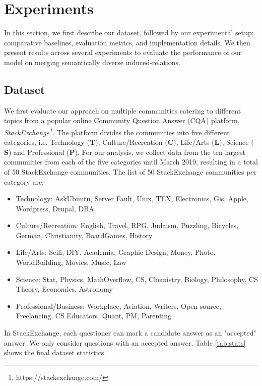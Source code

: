 \section{Experiments}
\label{sec:induced_experiments}
In this section, we first describe our dataset, followed by our experimental setup; comparative baselines, evaluation metrics, and implementation details. We then present results across several experiments to evaluate the performance of our model on merging semantically diverse induced-relations.

\subsection{Dataset}
We first evaluate our approach on multiple communities catering to different topics from a popular online Community Question Answer (CQA) platform, \emph{StackExchange\footnote{https://stackexchange.com/}}. The platform divides the communities into five different categories, i.e. Technology ($\mathbf{T}$), Culture/Recreation ($\mathbf{C}$), Life/Arts ($\mathbf{L}$), Science ($\mathbf{S}$) and Professional ($\mathbf{P}$).
For our analysis, we collect data from the ten largest communities from each of the five categories until March 2019, resulting in a total of 50 StackExchange communities.
The list of 50 StackExchange communities per category are;
\begin{itemize}
\item Technology: AskUbuntu, Server Fault, Unix, TEX, Electronics, Gis, Apple, Wordpress, Drupal, DBA
\item Culture/Recreation: English, Travel, RPG, Judaism, Puzzling, Bicycles, German, Christianity, BoardGames, History
\item Life/Arts: Scifi, DIY, Academia, Graphic Design, Money, Photo, WorldBuilding, Movies, Music, Law
\item Science: Stat, Physics, MathOverflow, CS, Chemistry, Biology, Philosophy, CS Theory, Economics, Astronomy

\item Professional/Business: Workplace, Aviation, Writers, Open source, Freelancing, CS Educators, Quant, PM, Parenting
\end{itemize}
In StackExchange, each questioner can mark a candidate answer as an "accepted" answer. We only consider questions with an accepted answer. Table \ref{tab:stats} shows the final dataset statistics.


